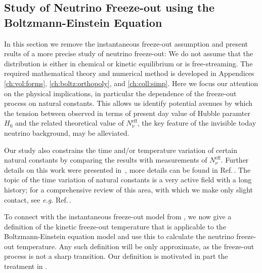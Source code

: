 \subsection{Study of Neutrino Freeze-out using the Boltzmann-Einstein Equation}\label{ch:param:studies}
In this section we remove the instantaneous freeze-out assumption and present rsults of a more precise study of neutrino freeze-out: We do not assume that the distribution is either in chemical or kinetic equilibrium or is free-streaming. The required mathematical theory and numerical method is developed in Appendices \ref{ch:vol:forms}, \ref{ch:boltz:orthopoly}, and \ref{ch:coll:simp}. Here we focus our attention on the physical implications, in particular the dependence of the freeze-out process on natural constants. This allows us identify potential avenues by which the tension between observed in terms of present day value of Hubble paramter $H_0$ and the related theoretical value of $N^{\mathrm{eff}}_\nu$, the key feature of the invisible today neutrino background, may be alleviated. 

Our study also constrains the time and/or temperature variation of certain natural constants by comparing the results with measurements of $N_\nu^{\mathrm{eff}}$. Further details on this work were presented in~,  more details can be found in Ref.\,\cite{Birrell:2014uka}. The topic of the time variation of natural constants is a very active field with a long history; for a comprehensive review of this area, with which we make only slight contact, see {\it e.g.\/} Ref.\,\cite{Uzan:2010pm}. 

To connect with the instantaneous freeze-out model from , we now give a definition of the kinetic freeze-out temperature that is applicable to the Boltzmann-Einstein equation model and use this to calculate the neutrino freeze-out temperature. Any such definition will be only approximate, as the freeze-out process is not a sharp transition. Our definition is motivated in part the treatment in \cite{Kolb:1990vq}. 

